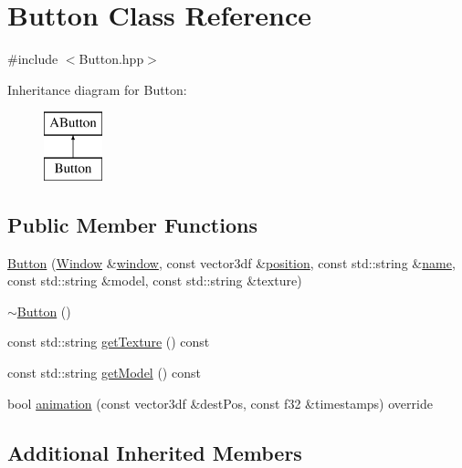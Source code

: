 \hypertarget{class_button}{}\section{Button Class Reference}
\label{class_button}


{\ttfamily \#include $<$Button.\+hpp$>$}

Inheritance diagram for Button\+:\begin{figure}[H]
\begin{center}
\leavevmode
\includegraphics[height=2.000000cm]{class_button}
\end{center}
\end{figure}
\subsection*{Public Member Functions}
\begin{DoxyCompactItemize}
\item 
\mbox{\hyperlink{class_button_aa43954b8d3bd4036c2f5145e78aef78d}{Button}} (\mbox{\hyperlink{class_window}{Window}} \&\mbox{\hyperlink{class_a_button_ab8b7ee994bd3b81cfd4ad639733c19df}{window}}, const vector3df \&\mbox{\hyperlink{class_a_button_a71db15822a0eeb093a07e2ac7ff76cd8}{position}}, const std\+::string \&\mbox{\hyperlink{class_a_button_aad1d2351e9dc41d747726be929fdb459}{name}}, const std\+::string \&model, const std\+::string \&texture)
\item 
\mbox{\hyperlink{class_button_a2a001eb9c3cc8ae54768a850dd345002}{$\sim$\+Button}} ()
\item 
const std\+::string \mbox{\hyperlink{class_button_a2456061acae03623de618323f0be722b}{get\+Texture}} () const
\item 
const std\+::string \mbox{\hyperlink{class_button_a96fb1c0a5d811e135f473d25634149a1}{get\+Model}} () const
\item 
bool \mbox{\hyperlink{class_button_a0bd4601e48eb6ef67ee192561fa4cfd0}{animation}} (const vector3df \&dest\+Pos, const f32 \&timestamps) override
\end{DoxyCompactItemize}
\subsection*{Additional Inherited Members}


